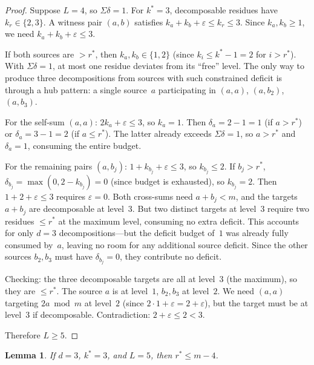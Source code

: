 \documentclass[11pt]{amsart}
\newtheorem{lemma}[theorem]{Lemma}
\theoremstyle{definition}
\theoremstyle{remark}
\begin{document}
\begin{proof}
Suppose $L = 4$, so $\Sigma\delta = 1$.
For $k^* = 3$, decomposable residues have $k_r \in \{2, 3\}$.
A witness pair $(a, b)$ satisfies $k_a + k_b + \varepsilon \le k_r \le 3$.
Since $k_a, k_b \ge 1$, we need $k_a + k_b + \varepsilon \le 3$.

If both sources are $> r^*$, then $k_a, k_b \in \{1, 2\}$ (since
$k_i \le k^* - 1 = 2$ for $i > r^*$).
With $\Sigma\delta = 1$, at most one residue deviates from its ``free''
level.  The only way to produce three decompositions from sources with
such constrained deficit is through a hub pattern: a single source~$a$
participating in $(a, a)$, $(a, b_2)$, $(a, b_3)$.

For the self-sum $(a, a)$: $2k_a + \varepsilon \le 3$, so $k_a = 1$.
Then $\delta_a = 2 - 1 = 1$ (if $a > r^*$) or $\delta_a = 3 - 1 = 2$ (if $a \le r^*$).
The latter already exceeds $\Sigma\delta = 1$, so $a > r^*$ and $\delta_a = 1$,
consuming the entire budget.

For the remaining pairs $(a, b_j)$: $1 + k_{b_j} + \varepsilon \le 3$,
so $k_{b_j} \le 2$.  If $b_j > r^*$, $\delta_{b_j} = \max(0, 2 - k_{b_j}) = 0$
(since budget is exhausted), so $k_{b_j} = 2$.
Then $1 + 2 + \varepsilon \le 3$ requires $\varepsilon = 0$.
Both cross-sums need $a + b_j < m$, and the targets $a + b_j$ are
decomposable at level~$3$.  But two distinct targets at level~$3$
require two residues $\le r^*$ at the maximum level, consuming no extra
deficit.  This accounts for only $d = 3$ decompositions---but the deficit
budget of~$1$ was already fully consumed by~$a$, leaving no room for
any additional source deficit.  Since the other sources $b_2, b_3$ must
have $\delta_{b_j} = 0$, they contribute no deficit.

Checking: the three decomposable targets are all at level~$3$ (the maximum),
so they are $\le r^*$.  The source $a$ is at level~$1$, $b_2, b_3$ at
level~$2$.  We need $(a, a)$ targeting $2a \bmod m$ at level~$2$
(since $2 \cdot 1 + \varepsilon = 2 + \varepsilon$), but the target must be
at level~$3$ if decomposable.  Contradiction: $2 + \varepsilon \le 2 < 3$.

Therefore $L \ge 5$.
\end{proof}

\begin{lemma}\label{lem:C-k3-rstar}
If $d = 3$, $k^* = 3$, and $L = 5$, then $r^* \le m - 4$.
\end{lemma}
\end{document}
